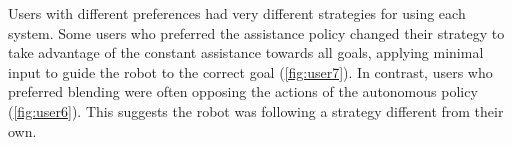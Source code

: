 Users with different preferences had very different strategies for using each system. Some users who preferred the assistance policy changed their strategy to take advantage of the constant assistance towards all goals, applying minimal input to guide the robot to the correct goal (\cref{fig:user7}). In contrast, users who preferred blending were often opposing the actions of the autonomous policy (\cref{fig:user6}). This suggests the robot was following a strategy different from their own.


%


